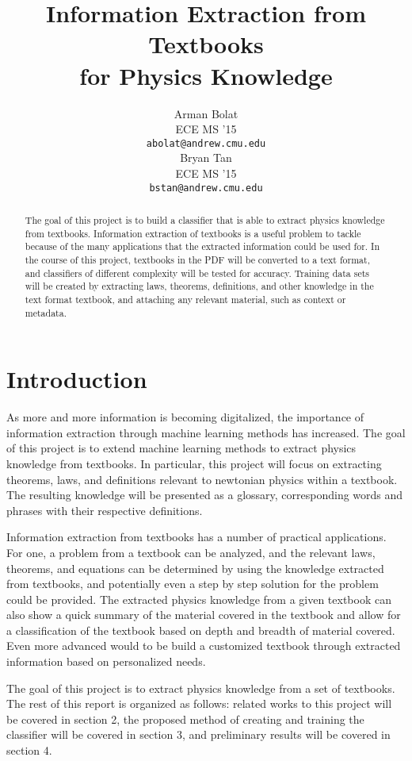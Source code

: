 \documentclass{article} %
\title{Information Extraction from Textbooks \\ for Physics Knowledge}
\author{
Arman Bolat \\
ECE MS '15 \\
\texttt{abolat@andrew.cmu.edu} \\
\And
Bryan Tan \\
ECE MS '15 \\
\texttt{bstan@andrew.cmu.edu} \\
}
\begin{document}
\maketitle


\begin{abstract}
The goal of this project is to build a classifier that is able to extract physics knowledge from textbooks. Information extraction of textbooks is a useful problem to tackle because of the many applications that the extracted information could be used for. In the course of this project, textbooks in the PDF will be converted to a text format, and classifiers of different complexity will be tested for accuracy. Training data sets will be created by extracting laws, theorems, definitions, and other knowledge in the text format textbook, and attaching any relevant material, such as context or metadata.
\end{abstract}

\section{Introduction}

As more and more information is becoming digitalized, the importance of information extraction through machine learning methods has increased. The goal of this project is to extend machine learning methods to extract physics knowledge from textbooks. In particular, this project will focus on extracting theorems, laws, and definitions relevant to newtonian physics within a textbook. The resulting knowledge will be presented as a glossary, corresponding words and phrases with their respective definitions.

Information extraction from textbooks has a number of practical applications. For one, a problem from a textbook can be analyzed, and the relevant laws, theorems, and equations can be determined by using the knowledge extracted from textbooks, and potentially even a step by step solution for the problem could be provided. The extracted physics knowledge from a given textbook can also show a quick summary of the material covered in the textbook and allow for a classification of the textbook based on depth and breadth of material covered. Even more advanced would to be build a customized textbook through extracted information based on personalized needs.

The goal of this project is to extract physics knowledge from a set of textbooks.
The rest of this report is organized as follows: related works to this project will be covered in section 2, the proposed method of creating and training the classifier will be covered in section 3, and preliminary results will be covered in section 4.
\end{document}
